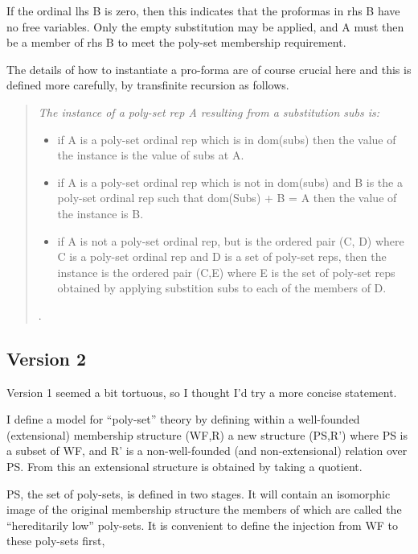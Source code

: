 \documentclass[numreferences]{rbjk}
\begin{document}
\begin{article}
If the ordinal \textsf{lhs B} is zero, then this indicates that the proformas in \textsf{rhs B} have no free variables.
Only the empty substitution may be applied, and \textsf{A} must then be a member of \textsf{rhs B} to meet the poly-set membership requirement.

The details of how to instantiate a pro-forma are of course crucial here and this is defined more carefully, by transfinite recursion as follows.

\begin{quote}
{\it
The instance of a poly-set rep \textsf{A} resulting from a substitution \textsf{subs} is:
\begin{itemize}

\item if \textsf{A} is a poly-set ordinal rep which is in \textsf{dom(subs)} then the value of the instance is the value of \textsf{subs} at \textsf{A}.

\item if \textsf{A} is a poly-set ordinal rep which is not in \textsf{dom(subs)} and \textsf{B} is the a poly-set ordinal rep such that \textsf{dom(Subs) + B = A} then the value of the instance is \textsf{B}.

\item if \textsf{A} is not a poly-set ordinal rep, but is the ordered pair \textsf{(C, D)} where \textsf{C} is a poly-set ordinal rep and \textsf{D} is a set of poly-set reps, then the instance is the ordered pair \textsf{(C,E)} where E is the set of poly-set reps obtained by applying substition \textsf{subs} to each of the members of \textsf{D}.
\end{itemize}.
}
\end{quote}

\subsection{Version 2}

Version 1 seemed a bit tortuous, so I thought I'd try a more concise statement.

I define a model for ``poly-set'' theory by defining within a well-founded (extensional) membership structure \textsf{(WF,R)} a new structure \textsf{(PS,R')} where \textsf{PS} is a subset of \textsf{WF}, and \textsf{R'} is a non-well-founded (and non-extensional) relation over \textsf{PS}. From this an extensional structure is obtained by taking a quotient.

\textsf{PS}, the set of poly-sets, is defined in two stages.
It will contain an isomorphic image of the original membership structure the members of which are called the ``hereditarily low'' poly-sets.
It is convenient to define the injection from \textsf{WF} to these poly-sets first,


\end{article}
\end{document}
